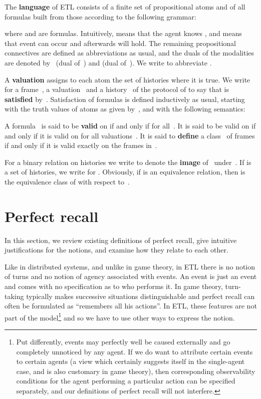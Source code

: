 \documentclass{article}
\def\dfn{\textbf}
\newcommand{\tiff}{if and only if\xspace}
\newcounter{#1}
\begin{document}
The \dfn{language} of ETL consists of a finite set  of propositional atoms
and of all formulas built from those according to the following grammar:

where  and  are formulas.
Intuitively,  means that the agent knows ,
and  means that event  can occur and afterwards  will hold.
The remaining propositional connectives are defined as abbreviations as usual,
and the duals of the modalities are denoted by~ (dual of~) and  (dual of~).
We write  to abbreviate .

A \dfn{valuation}  assigns to each atom the set of histories where it is true.
We write  for a frame~\F, a valuation~ and a history~ of the protocol of \F
to say that  is \dfn{satisfied} by~.
Satisfaction of formulas is defined inductively as usual,
starting with the truth values of atoms as given by~,
and with the following semantics:

A formula~ is said to be \dfn{valid} on  \tiff  for all~.
It is said to be valid on  \tiff it is valid on  for all valuations~.
It is said to \dfn{define} a class~ of frames
\tiff it is valid exactly on the frames in~.

For a binary relation  on histories
we write  to denote the \dfn{image} of~ under~.
If  is a set of histories, we write  for .
Obviously, if  is an equivalence relation, then  is the equivalence class of  with respect to~.

\section{Perfect recall}
\label{sec:defin-perf-recall}

In this section, we review existing definitions of perfect recall,
give intuitive justifications for the notions,
and examine how they relate to each other.

Like in distributed systems, and unlike in game theory,
in ETL there is no notion of turns and no notion of agency associated with events.
An event is just an event and comes with no specification as to who performs it.
In game theory, turn-taking typically makes successive situations distinguishable
and perfect recall can often be formulated as ``remembers all his actions''.
In ETL, these features are not part of the model\footnote{Put differently,
events may perfectly well be caused externally and go completely unnoticed by any agent.
If we do want to attribute certain events to certain agents
(a view which certainly suggests itself in the single-agent case,
and is also customary in game theory),
then corresponding observability conditions for the agent performing a particular action
can be specified separately,
and our definitions of perfect recall will not interfere.}
and so we have to use other ways to express the notion.
\end{document}
